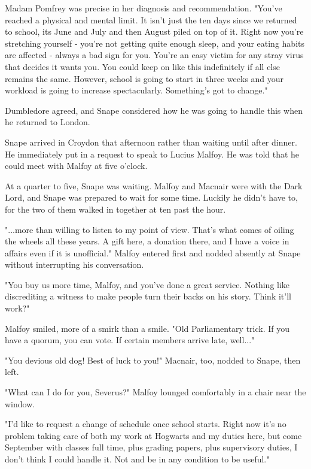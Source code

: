 \documentclass[a4paper,11pt]{article}
\begin{document}
Madam Pomfrey was precise in her diagnosis and recommendation. "You've reached a physical and mental limit. It isn't just the ten days since we returned to school, its June and July and then August piled on top of it. Right now you're stretching yourself - you're not getting quite enough sleep, and your eating habits are affected - always a bad sign for you. You're an easy victim for any stray virus that decides it wants you. You could keep on like this indefinitely if all else remains the same. However, school is going to start in three weeks and your workload is going to increase spectacularly. Something's got to change."

Dumbledore agreed, and Snape considered how he was going to handle this when he returned to London.

Snape arrived in Croydon that afternoon rather than waiting until after dinner. He immediately put in a request to speak to Lucius Malfoy. He was told that he could meet with Malfoy at five o'clock.

At a quarter to five, Snape was waiting. Malfoy and Macnair were with the Dark Lord, and Snape was prepared to wait for some time. Luckily he didn't have to, for the two of them walked in together at ten past the hour.

"...more than willing to listen to my point of view. That's what comes of oiling the wheels all these years. A gift here, a donation there, and I have a voice in affairs even if it is unofficial." Malfoy entered first and nodded absently at Snape without interrupting his conversation.

"You buy us more time, Malfoy, and you've done a great service. Nothing like discrediting a witness to make people turn their backs on his story. Think it'll work?"

Malfoy smiled, more of a smirk than a smile. "Old Parliamentary trick. If you have a quorum, you can vote. If certain members arrive late, well..."

"You devious old dog! Best of luck to you!" Macnair, too, nodded to Snape, then left.

"What can I do for you, Severus?" Malfoy lounged comfortably in a chair near the window.

"I'd like to request a change of schedule once school starts. Right now it's no problem taking care of both my work at Hogwarts and my duties here, but come September with classes full time, plus grading papers, plus supervisory duties, I don't think I could handle it. Not and be in any condition to be useful."
\end{document}
